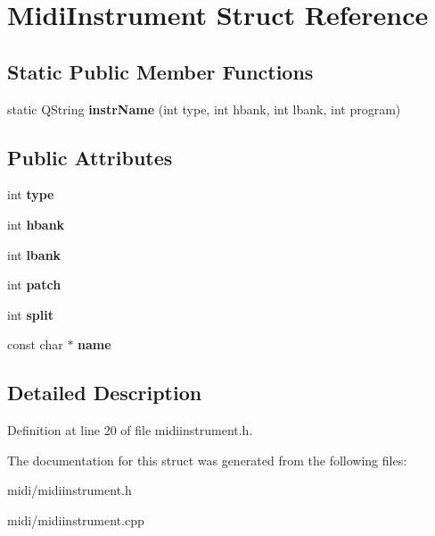 \hypertarget{struct_midi_instrument}{}\section{Midi\+Instrument Struct Reference}
\label{struct_midi_instrument}
\subsection*{Static Public Member Functions}
\begin{DoxyCompactItemize}
\item 
\mbox{\label{struct_midi_instrument_a8cf88b18de6231b96abd1cd1a9cb4cd9}} 
static Q\+String {\bfseries instr\+Name} (int type, int hbank, int lbank, int program)
\end{DoxyCompactItemize}
\subsection*{Public Attributes}
\begin{DoxyCompactItemize}
\item 
\mbox{\label{struct_midi_instrument_ad07c2769190e3491d310cee3b82d3102}} 
int {\bfseries type}
\item 
\mbox{\label{struct_midi_instrument_ad04dab072d3c14d6ae17ebbec0740f8f}} 
int {\bfseries hbank}
\item 
\mbox{\label{struct_midi_instrument_a97ea0e2bd7bd47380e48927a62bb8ec2}} 
int {\bfseries lbank}
\item 
\mbox{\label{struct_midi_instrument_abd000c1227541640bbd66d55f43ae092}} 
int {\bfseries patch}
\item 
\mbox{\label{struct_midi_instrument_a5f7979c688e1809bcf0d624b8241b210}} 
int {\bfseries split}
\item 
\mbox{\label{struct_midi_instrument_a8ce822492a03c9033b1ed71fd47f70d6}} 
const char $\ast$ {\bfseries name}
\end{DoxyCompactItemize}


\subsection{Detailed Description}


Definition at line 20 of file midiinstrument.\+h.



The documentation for this struct was generated from the following files\+:\begin{DoxyCompactItemize}
\item 
midi/midiinstrument.\+h\item 
midi/midiinstrument.\+cpp\end{DoxyCompactItemize}
